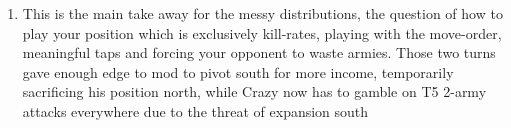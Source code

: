 \begin{enumerate}
    \begin{itemize}
        \item end of T2 7vs7, 13vs10 terr, 2vs3 movable armies 
        \item end of T4 7vs7, 13vs11 terr, 0vs3 movable armies
    \end{itemize}
    \item This is the main take away for the messy distributions, the question of how to play your position which is exclusively kill-rates, playing with the move-order, meaningful taps and forcing your opponent to waste armies. Those two turns gave enough edge to mod to pivot south for more income, temporarily sacrificing his position north, while Crazy now has to gamble on T5 2-army attacks everywhere due to the threat of expansion south
\end{enumerate}

